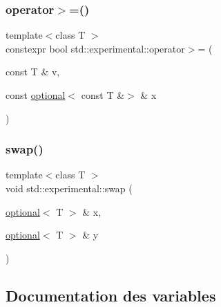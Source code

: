 \mbox{\label{namespacestd_1_1experimental_a943314dada174c65a0ac853cbdc89989}} 
\subsubsection{\texorpdfstring{operator$>$=()}{operator>=()}\hspace{0.1cm}{\footnotesize\ttfamily [9/9]}}
{\footnotesize\ttfamily template$<$class T $>$ \\
constexpr bool std\+::experimental\+::operator$>$= (\begin{DoxyParamCaption}\item[{const T \&}]{v,  }\item[{const \hyperlink{classstd_1_1experimental_1_1optional}{optional}$<$ const T \&$>$ \&}]{x }\end{DoxyParamCaption})}

\mbox{\label{namespacestd_1_1experimental_acdfba2d2e9c79f689a34c9cea5c5682d}} 
\subsubsection{\texorpdfstring{swap()}{swap()}}
{\footnotesize\ttfamily template$<$class T $>$ \\
void std\+::experimental\+::swap (\begin{DoxyParamCaption}\item[{\hyperlink{classstd_1_1experimental_1_1optional}{optional}$<$ T $>$ \&}]{x,  }\item[{\hyperlink{classstd_1_1experimental_1_1optional}{optional}$<$ T $>$ \&}]{y }\end{DoxyParamCaption})\hspace{0.3cm}{\ttfamily [noexcept]}}



\subsection{Documentation des variables}
\mbox{\label{namespacestd_1_1experimental_a93be82cb49ba2dc64a23c881ad152fd6}} 
